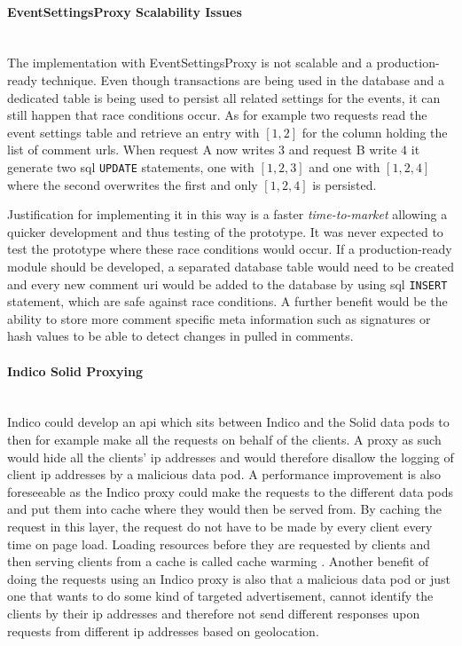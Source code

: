 \paragraph{EventSettingsProxy Scalability Issues}\mbox{}\\

The implementation with EventSettingsProxy is not scalable and a production-ready technique. Even though transactions are being used in the database and a dedicated table is being used to persist all related settings for the events, it can still happen that race conditions occur. As for example two requests read the event settings table and retrieve an entry with $[1,2]$ for the column holding the list of comment \glspl{url}. When request A now writes $3$ and request B write $4$ it generate two \gls{sql} \texttt{UPDATE} statements, one with $[1,2,3]$ and one with $[1,2,4]$ where the second overwrites the first and only $[1,2,4]$ is persisted.

Justification for implementing it in this way is a faster \textit{time-to-market} allowing a quicker development and thus testing of the prototype. It was never expected to test the prototype where these race conditions would occur. If a production-ready module should be developed, a separated database table would need to be created and every new comment \gls{uri} would be added to the database by using \gls{sql} \texttt{INSERT} statement, which are safe against race conditions. A further benefit would be the ability to store more comment specific meta information such as signatures or hash values to be able to detect changes in pulled in comments.
\vspace{0.5cm}
\paragraph{Indico Solid Proxying}\mbox{}\\

Indico could develop an \gls{api} which sits between Indico and the Solid data pods to then for example make all the requests on behalf of the clients. A proxy as such would hide all the clients' \gls{ip} addresses and would therefore disallow the logging of client \gls{ip} addresses by a malicious data pod. A performance improvement is also foreseeable as the Indico proxy could make the requests to the different data pods and put them into cache where they would then be served from. By caching the request in this layer, the request do not have to be made by every client every time on page load. Loading resources before they are requested by clients and then serving clients from a cache is called cache warming \cite{cache-warming}. Another benefit of doing the requests using an Indico proxy is also that a malicious data pod or just one that wants to do some kind of targeted advertisement, cannot identify the clients by their \gls{ip} addresses and therefore not send different responses upon requests from different \gls{ip} addresses based on geolocation.

